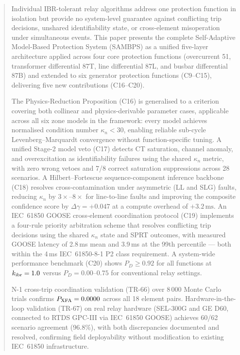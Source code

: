 \documentclass[journal,twoside]{IEEEtran}
\begin{document}
\begin{abstract}
Individual IBR-tolerant relay algorithms address one protection function in
isolation but provide no system-level guarantee against conflicting trip
decisions, unshared identifiability state, or cross-element misoperation under
simultaneous events.
This paper presents the complete Self-Adaptive Model-Based Protection System
(SAMBPS) as a unified five-layer architecture applied across four core protection
functions (overcurrent 51, transformer differential 87T, line differential 87L,
and busbar differential 87B) and extended to six generator protection functions
(C9--C15), delivering five new contributions (C16--C20).

The Physics-Reduction Proposition (C16) is generalised to a criterion covering
both collinear and physics-derivable parameter cases, applicable across all six
zone models in the framework: every model achieves normalised condition number
$\kappa_n < 30$, enabling reliable sub-cycle Levenberg--Marquardt convergence
without function-specific tuning.
A unified Stage-2 model veto (C17) detects CT saturation, channel anomaly, and
overexcitation as identifiability failures using the shared $\kappa_n$ metric,
with zero wrong vetoes and 7/8 correct saturation suppressions across 28 scenarios.
A Hilbert--Fortescue sequence-component inference backbone (C18) resolves
cross-contamination under asymmetric (LL and SLG) faults, reducing $\kappa_n$
by $3\times$--$8\times$ for line-to-line faults and improving the composite
confidence score by $\Delta\gamma = +0.047$ at a compute overhead of
$+3.2\,\text{ms}$.
An IEC~61850 GOOSE cross-element coordination protocol (C19) implements a
four-rule priority arbitration scheme that resolves conflicting trip decisions
using the shared $\kappa_n$ state and SPRT outcomes, with measured GOOSE latency
of 2.8\,ms mean and 3.9\,ms at the 99th percentile --- both within the 4\,ms
IEC~61850-8-1 P2 class requirement.
A system-wide performance benchmark (C20) shows $P_D \geq 0.92$ for all
functions at $k_{\rm ibr} = 1.0$ versus $P_D = 0.00$--$0.75$ for conventional
relay settings.

N-1 cross-trip coordination validation (TR-66) over 8\,000 Monte Carlo trials
confirms $P_{\rm XFA} = 0.0000$ across all 18 element pairs.
Hardware-in-the-loop validation (TR-67) on real relay hardware (SEL-300G and
GE D60, connected to RTDS GPC-III via IEC~61850 GOOSE) achieves 60/62 scenario
agreement (96.8\%), with both discrepancies documented and resolved, confirming
field deployability without modification to existing IEC~61850 infrastructure.
\end{abstract}
\end{document}
